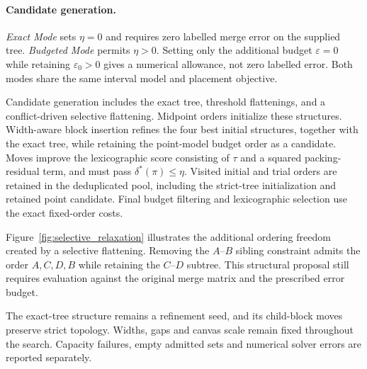 \documentclass[review]{vgtc}
\begin{document}
\paragraph{Candidate generation.}
\emph{Exact Mode} sets $\eta=0$ and requires zero labelled merge error on the supplied tree. \emph{Budgeted Mode} permits $\eta>0$. Setting only the additional budget $\varepsilon=0$ while retaining $\varepsilon_0>0$ gives a numerical allowance, not zero labelled error. Both modes share the same interval model and placement objective.

Candidate generation includes the exact tree, threshold flattenings, and a conflict-driven selective flattening. Midpoint orders initialize these structures. Width-aware block insertion refines the four best initial structures, together with the exact tree, while retaining the point-model budget order as a candidate. Moves improve the lexicographic score consisting of $\tau$ and a squared packing-residual term, and must pass $\delta^*(\pi)\le\eta$. Visited initial and trial orders are retained in the deduplicated pool, including the strict-tree initialization and retained point candidate. Final budget filtering and lexicographic selection use the exact fixed-order costs. 

Figure~\ref{fig:selective_relaxation} illustrates the additional ordering freedom created by a selective flattening. Removing the $A$--$B$ sibling constraint admits the order $A,C,D,B$ while retaining the $C$--$D$ subtree. This structural proposal still requires evaluation against the original merge matrix and the prescribed error budget.

The exact-tree structure remains a refinement seed, and its child-block moves preserve strict topology. Widths, gaps and canvas scale remain fixed throughout the search. Capacity failures, empty admitted sets and numerical solver errors are reported separately.
\end{document}
